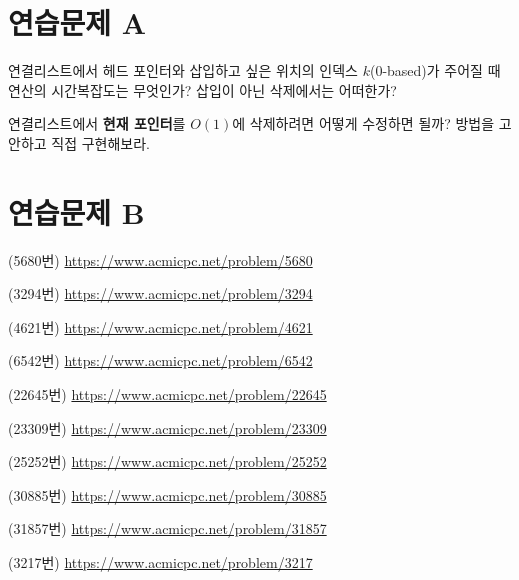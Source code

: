 \section{연습문제 A}
\begin{problem} \label{pb: linked-list-insert}
    연결리스트에서 헤드 포인터와 삽입하고 싶은 위치의 인덱스 $k$($0$-based)가 주어질 때 연산의 시간복잡도는 무엇인가? 삽입이 아닌 삭제에서는 어떠한가?
\end{problem}
\begin{problem} \label{pb: linked-list-delete}
    연결리스트에서 \textbf{현재 포인터}를 $O(1)$에 삭제하려면 어떻게 수정하면 될까? 방법을 고안하고 직접 구현해보라.
\end{problem}

\section{연습문제 B}
\begin{problem}
    (5680번) \url{https://www.acmicpc.net/problem/5680}
\end{problem}
\begin{problem}
    (3294번) \url{https://www.acmicpc.net/problem/3294}
\end{problem}
\begin{problem}
    (4621번) \url{https://www.acmicpc.net/problem/4621}
\end{problem}
\begin{problem}
    (6542번) \url{https://www.acmicpc.net/problem/6542}
\end{problem}
\begin{problem}
    (22645번) \url{https://www.acmicpc.net/problem/22645}
\end{problem}
\begin{problem}
    (23309번) \url{https://www.acmicpc.net/problem/23309}
\end{problem}
\begin{problem}
    (25252번) \url{https://www.acmicpc.net/problem/25252}
\end{problem}
\begin{problem}
    (30885번) \url{https://www.acmicpc.net/problem/30885}
\end{problem}
\begin{problem}
    (31857번) \url{https://www.acmicpc.net/problem/31857}
\end{problem}
\begin{problem}
    (3217번) \url{https://www.acmicpc.net/problem/3217}
\end{problem}

